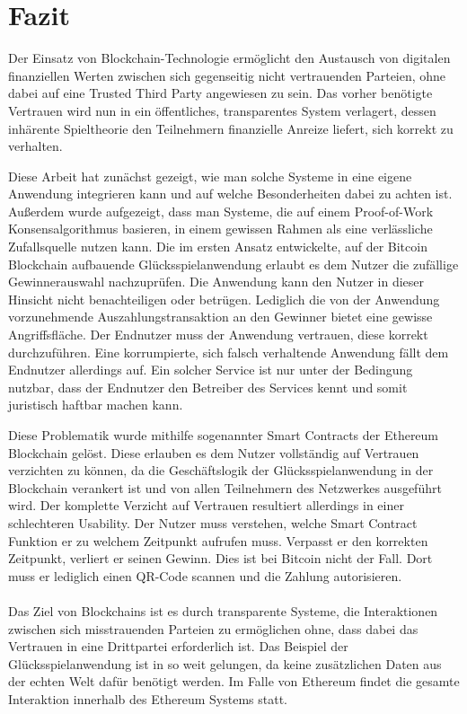 \chapter{Fazit} %
Der Einsatz von Blockchain-Technologie ermöglicht
den Austausch von digitalen finanziellen Werten zwischen sich gegenseitig nicht vertrauenden Parteien, ohne dabei auf eine Trusted Third Party angewiesen zu sein.
Das vorher benötigte Vertrauen wird nun in ein öffentliches, transparentes System verlagert, dessen inhärente Spieltheorie den Teilnehmern finanzielle Anreize liefert, sich korrekt zu verhalten. 

Diese Arbeit hat zunächst gezeigt, wie man solche Systeme in eine eigene Anwendung integrieren kann und auf welche Besonderheiten dabei zu achten ist. 
Außerdem wurde aufgezeigt, dass man Systeme, die auf einem Proof-of-Work Konsensalgorithmus basieren, in einem gewissen Rahmen als eine verlässliche Zufallsquelle nutzen kann.
Die im ersten Ansatz entwickelte, auf der Bitcoin Blockchain aufbauende Glücksspielanwendung erlaubt es dem Nutzer die zufällige Gewinnerauswahl nachzuprüfen. Die Anwendung kann den Nutzer in dieser Hinsicht nicht benachteiligen oder betrügen. Lediglich die von der Anwendung vorzunehmende Auszahlungstransaktion an den Gewinner bietet eine gewisse Angriffsfläche. Der Endnutzer muss der Anwendung vertrauen, diese korrekt durchzuführen. Eine korrumpierte, sich falsch verhaltende Anwendung fällt dem Endnutzer allerdings auf. Ein solcher Service ist nur unter der Bedingung nutzbar, dass der Endnutzer den Betreiber des Services kennt und somit juristisch haftbar machen kann. 

Diese Problematik wurde mithilfe sogenannter Smart Contracts der Ethereum Blockchain gelöst.
Diese erlauben es dem Nutzer vollständig auf Vertrauen verzichten zu können, da die Geschäftslogik der Glücksspielanwendung in der Blockchain verankert ist und von allen Teilnehmern des Netzwerkes ausgeführt wird. Der komplette Verzicht auf Vertrauen resultiert allerdings in einer schlechteren Usability. Der Nutzer muss verstehen, welche Smart Contract Funktion er zu welchem Zeitpunkt aufrufen muss. Verpasst er den korrekten Zeitpunkt, verliert er seinen Gewinn. Dies ist bei Bitcoin nicht der Fall. Dort muss er lediglich einen QR-Code scannen und die Zahlung autorisieren.\\\\


Das Ziel von Blockchains ist es durch transparente Systeme, die Interaktionen zwischen sich misstrauenden Parteien zu ermöglichen ohne, dass dabei das Vertrauen in eine Drittpartei erforderlich ist. Das Beispiel der Glücksspielanwendung ist in so weit gelungen, da keine zusätzlichen Daten aus der echten Welt dafür benötigt werden. Im Falle von Ethereum findet die gesamte Interaktion innerhalb des Ethereum Systems statt.

